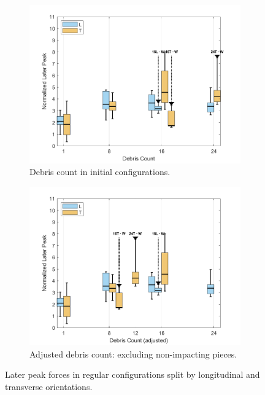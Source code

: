 \documentclass{article}
\begin{document}
\begin{figure}[htbp]
    \centering
    \begin{subfigure}[t]{0.9\textwidth}
        \centering
        \includegraphics[width=\textwidth]{LaterPeak_Regular_SplitByTrial.png}
        \caption{Debris count in initial configurations.}
        \label{fig:laterpeak_regular_original}
    \end{subfigure}
    \hfill
    \begin{subfigure}[t]{0.9\textwidth}
        \centering
        \includegraphics[width=\textwidth]{LaterPeak_Regular_RemappedT.png}
        \caption{Adjusted debris count: excluding non-impacting pieces.}
        \label{fig:laterpeak_regular_remap}
    \end{subfigure}
    \caption{Later peak forces  in regular configurations split by longitudinal and transverse orientations.}
    \label{fig:laterpeak_regular_split}
\end{figure}
\end{document}
